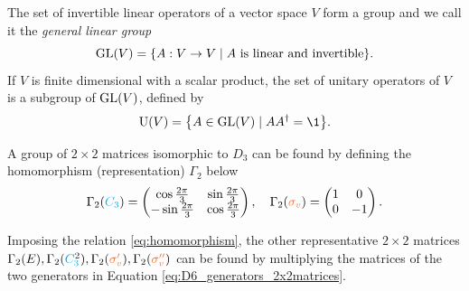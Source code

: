 \begin{definition} \label{def:groups_of_matrices}
The set of invertible linear operators of a vector space $V$ form a group and we call it the \textit{general linear group}
\begin{equation} \label{eq:general_linear_GL(V)}
{\text{GL}}(V) = \qty{A: V \to V \mid A \text{ is linear and invertible}}.
\end{equation}
If $V$ is finite dimensional with a scalar product, the set of unitary operators of $V$ is a subgroup of ${\text{GL}}(V)$, defined by
\begin{equation} \label{eq:unitary_operators_U(V)}
\U(V) = \qty{A \in \GL(V) \mid A A^\dagger = \1}.
\end{equation}
\end{definition}

\begin{example} \label{ex:2x2_rep}
A group of $2\times 2$ matrices isomorphic to $D_3$ can be found by defining the homomorphism (representation) $\Gamma_2$ below
\begin{equation} \label{eq:D6_generators_2x2matrices}
\Gamma_2(\Ct) =
\begin{pmatrix}
\cos{\frac{2\pi}{3}} & \sin{\frac{2\pi}{3}} \\
-\sin{\frac{2\pi}{3}} & \cos{\frac{2\pi}{3}}
\end{pmatrix},
\quad
\Gamma_2(\sv) =
\begin{pmatrix}
1 & 0 \\
0 & -1
\end{pmatrix}.
\end{equation}

Imposing the relation \ref{eq:homomorphism}, the other representative $2\times 2$ matrices $\Gamma_2(E), \Gamma_2(\Ctn{2}), \Gamma_2(\svp), \Gamma_2(\svpp)$ can be found by multiplying the matrices of the two generators in Equation \ref{eq:D6_generators_2x2matrices}.
\end{example}

